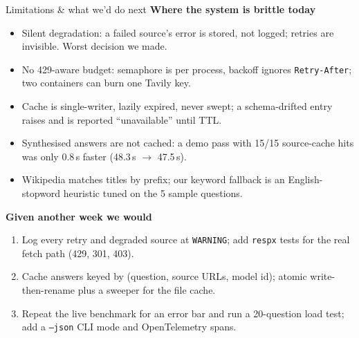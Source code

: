 \documentclass[aspectratio=169,11pt]{beamer}
\begin{document}
\begin{frame}{Limitations \& what we'd do next}
  \textbf{Where the system is brittle today}
  \begin{itemize}\setlength\itemsep{0.3em}
    \item Silent degradation: a failed source's error is stored, not logged; retries are invisible. Worst decision we made.
    \item No 429-aware budget: semaphore is per process, backoff ignores \texttt{Retry-After}; two containers can burn one Tavily key.
    \item Cache is single-writer, lazily expired, never swept; a schema-drifted entry raises and is reported ``unavailable'' until TTL.
    \item Synthesised answers are not cached: a demo pass with 15/15 source-cache hits was only 0.8\,s faster (48.3\,s $\to$ 47.5\,s).
    \item Wikipedia matches titles by prefix; our keyword fallback is an English-stopword heuristic tuned on the 5 sample questions.
  \end{itemize}

  \vspace{0.4em}
  \textbf{Given another week we would}
  \begin{enumerate}\setlength\itemsep{0.3em}
    \item Log every retry and degraded source at \texttt{WARNING}; add \texttt{respx} tests for the real fetch path (429, 301, 403).
    \item Cache answers keyed by (question, source URLs, model id); atomic write-then-rename plus a sweeper for the file cache.
    \item Repeat the live benchmark for an error bar and run a 20-question load test; add a \texttt{--json} CLI mode and OpenTelemetry spans.
  \end{enumerate}
\end{frame}
\end{document}
